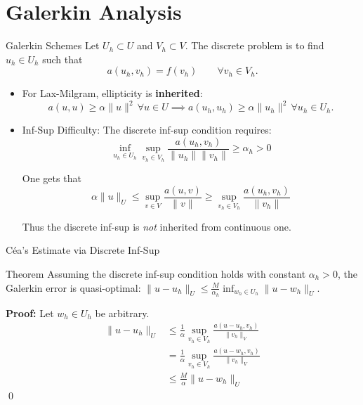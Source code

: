 \documentclass[aspectratio=169]{beamer}
\begin{document}
\section{Galerkin Analysis}

\begin{frame}{Galerkin Schemes}
    Let $U_h \subset U$ and $V_h \subset V$. The discrete problem is to find $u_h \in U_h$ such that 
        $$a(u_h, v_h) = f(v_h) \qquad \forall v_h \in V_h.$$
    
        \begin{itemize}
            \item For Lax-Milgram, ellipticity is \textbf{inherited}: 
                $$a(u,u) \ge \alpha\|u\|^2 \, \forall u \in U \implies a(u_h, u_h) \ge \alpha\|u_h\|^2 \, \forall u_h \in U_h.$$
    
             \item Inf-Sup Difficulty: The discrete inf-sup condition requires:
                $$ \inf_{u_h \in U_h} \sup_{v_h \in V_h} \frac{a(u_h, v_h)}{\|u_h\| \|v_h\|} \ge \alpha_h > 0 $$

                One gets that
                $$ \alpha \| u \|_U \leq \sup_{v \in V} \frac{a(u, v)}{\| v\|} \geq \sup_{v_h \in V_h} \frac{a(u_h, v_h)}{\| v_h\|} $$

                Thus the discrete inf-sup is \emph{not} inherited from continuous one. 
    
        \end{itemize}
\end{frame}

\begin{frame}{Céa's Estimate via Discrete Inf-Sup}
    \begin{block}{Theorem}
        Assuming the discrete inf-sup condition holds with constant $\alpha_h > 0$, the Galerkin error is quasi-optimal: $\|u - u_h\|_U \le \frac{M}{\alpha_h} \inf_{w_h \in U_h} \|u - w_h\|_U$.
    \end{block}
    
    \textbf{Proof:} Let $w_h \in U_h$ be arbitrary.
    \begin{align*}
        \|u - u_h\|_U &\le \frac{1}{\alpha} \sup_{v_h \in V_h} \frac{a(u - u_h, v_h)}{\|v_h\|_V} \tag{Discrete Inf-Sup} \\
        &= \frac{1}{\alpha} \sup_{v_h \in V_h} \frac{a(u - w_h, v_h)}{\|v_h\|_V} \tag{Galerkin Orthog. $a(u-u_h, v_h)=0$} \\
        &\le \frac{M}{\alpha} \|u - w_h\|_U \tag{Continuity of $a(\cdot,\cdot)$}
    \end{align*}
    \qed
\end{frame}
\end{document}
